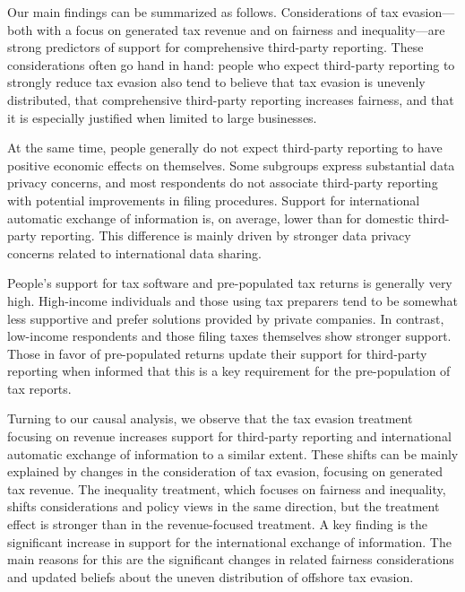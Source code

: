 \documentclass[12pt]{article}
\begin{document}


Our main findings can be summarized as follows. Considerations of tax evasion---both with a focus on generated tax revenue and on fairness and inequality---are strong predictors of support for comprehensive third-party reporting. These considerations often go hand in hand: people who expect third-party reporting to strongly reduce tax evasion also tend to believe that tax evasion is unevenly distributed, that comprehensive third-party reporting increases fairness, and that it is especially justified when limited to large businesses.

At the same time, people generally do not expect third-party reporting to have positive economic effects on themselves. Some subgroups express substantial data privacy concerns, and most respondents do not associate third-party reporting with potential improvements in filing procedures. Support for international automatic exchange of information is, on average, lower than for domestic third-party reporting. This difference is mainly driven by stronger data privacy concerns related to international data sharing.

People's support for tax software and pre-populated tax returns is generally very high. High-income individuals and those using tax preparers tend to be somewhat less supportive and prefer solutions provided by private companies. In contrast, low-income respondents and those filing taxes themselves show stronger support. Those in favor of pre-populated returns update their support for third-party reporting when informed that this is a key requirement for the pre-population of tax reports.

Turning to our causal analysis, we observe that the tax evasion treatment focusing on revenue increases support for third-party reporting and international automatic exchange of information to a similar extent. These shifts can be mainly explained by changes in the consideration of tax evasion, focusing on generated tax revenue. The inequality treatment, which focuses on fairness and inequality, shifts considerations and policy views in the same direction, but the treatment effect is stronger than in the revenue-focused treatment. A key finding is the significant increase in support for the international exchange of information. The main reasons for this are the significant changes in related fairness considerations and updated beliefs about the uneven distribution of offshore tax evasion. %
\end{document}
